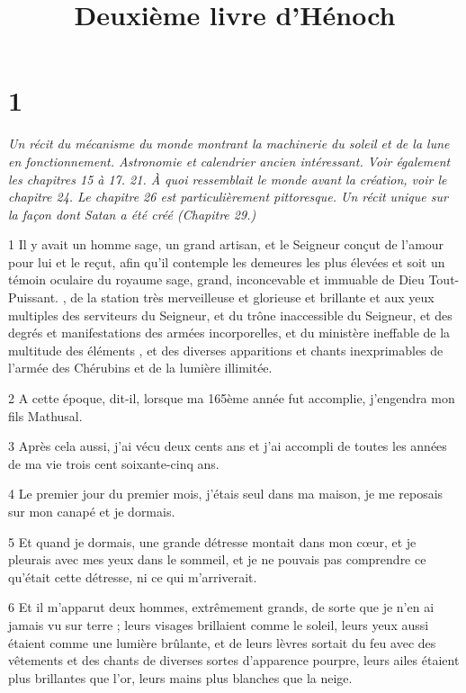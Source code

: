 

\title{Deuxième livre d'Hénoch}

\chapter{1}

\par \textit{Un récit du mécanisme du monde montrant la machinerie du soleil et de la lune en fonctionnement. Astronomie et calendrier ancien intéressant. Voir également les chapitres 15 à 17. 21. À quoi ressemblait le monde avant la création, voir le chapitre 24. Le chapitre 26 est particulièrement pittoresque. Un récit unique sur la façon dont Satan a été créé (Chapitre 29.)}

\par 1 Il y avait un homme sage, un grand artisan, et le Seigneur conçut de l'amour pour lui et le reçut, afin qu'il contemple les demeures les plus élevées et soit un témoin oculaire du royaume sage, grand, inconcevable et immuable de Dieu Tout-Puissant. , de la station très merveilleuse et glorieuse et brillante et aux yeux multiples des serviteurs du Seigneur, et du trône inaccessible du Seigneur, et des degrés et manifestations des armées incorporelles, et du ministère ineffable de la multitude des éléments , et des diverses apparitions et chants inexprimables de l'armée des Chérubins et de la lumière illimitée.

\par 2 A cette époque, dit-il, lorsque ma 165ème année fut accomplie, j'engendra mon fils Mathusal.

\par 3 Après cela aussi, j'ai vécu deux cents ans et j'ai accompli de toutes les années de ma vie trois cent soixante-cinq ans.

\par 4 Le premier jour du premier mois, j'étais seul dans ma maison, je me reposais sur mon canapé et je dormais.

\par 5 Et quand je dormais, une grande détresse montait dans mon cœur, et je pleurais avec mes yeux dans le sommeil, et je ne pouvais pas comprendre ce qu'était cette détresse, ni ce qui m'arriverait.

\par 6 Et il m'apparut deux hommes, extrêmement grands, de sorte que je n'en ai jamais vu sur terre ; leurs visages brillaient comme le soleil, leurs yeux aussi étaient comme une lumière brûlante, et de leurs lèvres sortait du feu avec des vêtements et des chants de diverses sortes d'apparence pourpre, leurs ailes étaient plus brillantes que l'or, leurs mains plus blanches que la neige.

